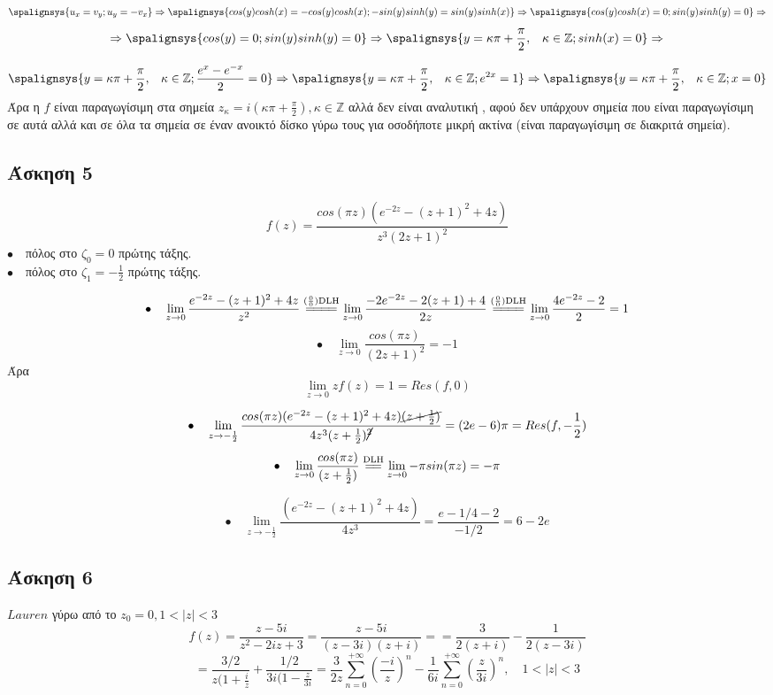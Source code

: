 \documentclass[12pt]{article}
\begin{document}
\[
\spalignsys {u_x=v_y;u_y=-v_x} \Rightarrow  
\spalignsys {cos(y)cosh(x)=-cos(y)cosh(x) ;
-sin(y)sinh(y)=sin(y)sinh(x)}
\Rightarrow 
\spalignsys
{cos(y)cosh(x)=0;
sin(y)sinh(y)=0} \Rightarrow
\]
\[
\Rightarrow
\spalignsys
{cos(y)=0;
sin(y)sinh(y)=0} \Rightarrow
\spalignsys
{y=\kappa \pi + \frac{\pi}{2}  {,}\quad \kappa \in \mathbb{Z};
sinh(x)=0} \Rightarrow
\]

\[
\spalignsys
{y=\kappa \pi + \frac{\pi}{2}  {,}\quad \kappa \in \mathbb{Z};
\frac{e^x-e^{-x}}{2}=0} 
\Rightarrow
\spalignsys
{y=\kappa \pi + \frac{\pi}{2}  {,}\quad \kappa \in \mathbb{Z};
e^{2x}=1}\Rightarrow
\spalignsys
{y=\kappa \pi + \frac{\pi}{2} {,}\quad \kappa \in \mathbb{Z};
x=0}
\]
Άρα η $f$ είναι παραγωγίσιμη στα σημεία $z_\kappa= i\left(\kappa \pi + \frac{\pi}{2} \right), \kappa\in\mathbb{Z} $ αλλά δεν είναι αναλυτική , αφού δεν υπάρχουν σημεία που είναι παραγωγίσιμη σε αυτά αλλά και σε όλα τα σημεία σε έναν ανοικτό δίσκο γύρω τους για οσοδήποτε
μικρή ακτίνα (είναι παραγωγίσιμη σε διακριτά σημεία).
\newpage
 \subsection{Άσκηση 5}
$$f(z)= \frac{cos(\pi z)(e^{-2z} - (z+1)^2 +4z)}{z^3(2z+1)^2}
$$
$\bullet \quad $πόλος στο $ζ_0=0$ πρώτης τάξης.\\
$\bullet \quad $πόλος στο $ζ_1=-\frac{1}{2}$ πρώτης τάξης.

$$
\bullet \quad \lim_{z \rightarrow 0} \frac{e^{-2z} - (z+1)^2 +4z}{z^2}
\overset{\mathrm{(\frac{0}{0})DLH}}{=\joinrel=\joinrel=\joinrel=}
\lim_{z \rightarrow 0} \frac{-2e^{-2z} - 2(z+1)+4}{2z}
\overset{\mathrm{(\frac{0}{0})DLH}}{=\joinrel=\joinrel=\joinrel=}
\lim_{z \rightarrow 0} \frac{4e^{-2z}- 2}{2}=1
$$
$$
\bullet \quad \lim_{z \rightarrow 0} \frac{cos(\pi z)}{(2z+1)^2}=-1
$$
Άρα $$
\lim_{z \rightarrow 0} zf(z)=1 =Res(f,0)
$$

$$\bullet \quad \lim_{z \rightarrow -\frac{1}{2}}
\frac{cos(\pi z)(e^{-2z} - (z+1)^2 +4z)\cancel{(z+\frac{1}{2})}}{4z^3(z+\frac{1}{2})\cancel{^2}}=(2e-6)\pi=Res(f,-\frac{1}{2})
$$
$$
\bullet \quad \lim_{z \rightarrow 0} \frac{cos(\pi z)}{(z+\frac{1}{2})}\overset{\mathrm{DLH}}{=\joinrel=} 
\lim_{z \rightarrow 0} -\pi sin(\pi z) =-\pi
$$

$$\bullet \quad \lim_{z \rightarrow -\frac{1}{2}}
\frac{(e^{-2z} - (z+1)^2 +4z)}{4z^3}=\frac{e-1/4-2}{-1/2}=6-2e
$$
 \subsection{Άσκηση 6}
$Lauren $ γύρω από το $z_0=0 , 1<|z|<3$
$$
f(z)=\frac{z-5i}{z^2-2iz+3}=\frac{z-5i}{(z-3i)(z+i)}=
=\frac{3}{2(z+i)}-\frac{1}{2(z-3i)}
$$
$$=
\frac{3/2}{z(1+\frac{i}{z}}+\frac{1/2}{3i(1-\frac{z}{3i}}=
\frac{3}{2z}\sum_{n=0}^{+\infty}\left(\frac{-i}{z}\right)^n-\frac{1}{6i}\sum_{n=0}^{+\infty}\left(\frac{z}{3i}\right)^n ,\quad 1<|z|<3
$$
\newpage
\end{document}
